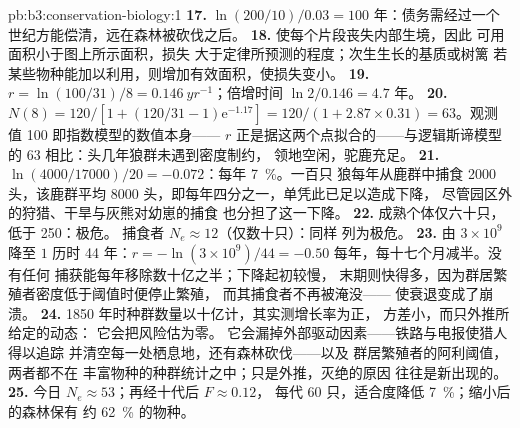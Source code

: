 \begin{solution}{pb:b3:conservation-biology:1}
\textbf{17.} $\ln(200/10)/0.03 = 100$ 年：债务需经过一个
世纪方能偿清，远在森林被砍伐之后。
\textbf{18.} 使每个片段丧失内部生境，因此
可用面积小于图上所示面积，损失
大于定律所预测的程度；次生生长的基质或树篱
若某些物种能加以利用，则增加有效面积，使损失变小。
\textbf{19.} $r = \ln(100/31)/8 = \qty{0.146}{yr^{-1}}$；倍增时间
$\ln 2/0.146 = 4.7$ 年。
\textbf{20.} $N(8) = 120/[1 + (120/31 - 1)\mathrm{e}^{-1.17}] = 120/(1 +
2.87\times 0.31) = 63$。观测值 100 即指数模型的数值本身——
$r$ 正是据这两个点拟合的——与逻辑斯谛模型的
63 相比：头几年狼群未遇到密度制约，
领地空闲，驼鹿充足。
\textbf{21.} $\ln(4000/\num{17000})/20 = -0.072$：每年 \qty{7}{\%}。一百只
狼每年从鹿群中捕食 \num{2000} 头，该鹿群平均
\num{8000} 头，即每年四分之一，单凭此已足以造成下降，
尽管园区外的狩猎、干旱与灰熊对幼崽的捕食
也分担了这一下降。
\textbf{22.} 成熟个体仅六十只，低于 250：极危。
捕食者 $N_{e} \approx 12$（仅数十只）：同样
列为极危。
\textbf{23.} 由 $3\times 10^{9}$ 降至 $1$ 历时 44 年：$r = -\ln(3\times
10^{9})/44 = -0.50$ 每年，每十七个月减半。没有任何
捕获能每年移除数十亿之半；下降起初较慢，
末期则快得多，因为群居繁殖者密度低于阈值时便停止繁殖，
而其捕食者不再被淹没——
使衰退变成了崩溃。
\textbf{24.} 1850 年时种群数量以十亿计，其实测增长率为正，
方差小，而只外推所给定的动态：
它会把风险估为零。
它会漏掉外部驱动因素——铁路与电报使猎人得以追踪
并清空每一处栖息地，还有森林砍伐——以及
群居繁殖者的阿利阈值，两者都不在
丰富物种的种群统计之中；只是外推，灭绝的原因
往往是新出现的。
\textbf{25.} 今日 $N_{e} \approx 53$；再经十代后 $F \approx 0.12$，
每代 60 只，适合度降低 \qty{7}{\%}；缩小后的森林保有
约 \qty{62}{\%} 的物种。
\end{solution}
